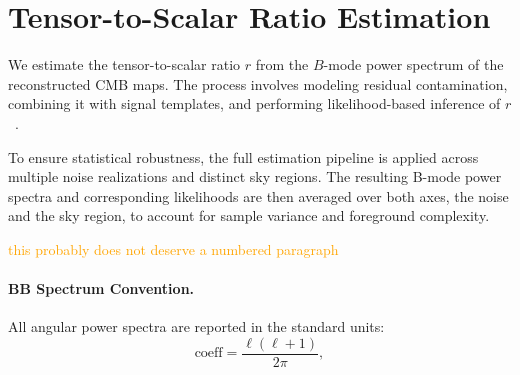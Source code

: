 \documentclass[fleqn,usenatbib]{mnras}
\newcommand{\je}[1]{\textcolor{orange}{#1}}
\begin{document}
\section{Tensor-to-Scalar Ratio Estimation}
\label{sec:r_estimation}

We estimate the tensor-to-scalar ratio \( r \) from the \( B \)-mode power spectrum of the reconstructed CMB maps. The process involves modeling residual contamination, combining it with signal templates, and performing likelihood-based inference of \( r \)~\citep{STOMPER16, ERRAR18}.

To ensure statistical robustness, the full estimation pipeline is applied across multiple noise realizations and distinct sky regions. The resulting B-mode power spectra and corresponding likelihoods are then averaged over both axes, the noise and the sky region, to account for sample variance and foreground complexity.

\je{this probably does not deserve a numbered paragraph}
\paragraph{BB Spectrum Convention.}
All angular power spectra are reported in the standard units:
\[
\text{coeff} = \frac{\ell(\ell + 1)}{2\pi},
\]
\end{document}
